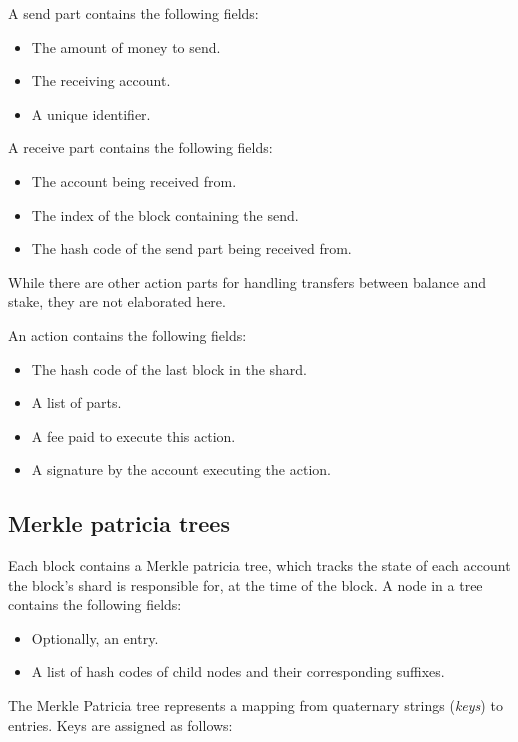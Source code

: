 \documentclass{article}
\begin{document}
A send part contains the following fields:

\begin{itemize}
  \item The amount of money to send.
  \item The receiving account.
  \item A unique identifier.
\end{itemize}

A receive part contains the following fields:

\begin{itemize}
  \item The account being received from.
  \item The index of the block containing the send.
  \item The hash code of the send part being received from.
\end{itemize}

While there are other action parts for handling transfers between balance and stake, they are not elaborated here.

An action contains the following fields:

\begin{itemize}
  \item The hash code of the last block in the shard.
  \item A list of parts.
  \item A fee paid to execute this action.
  \item A signature by the account executing the action.
\end{itemize}

\subsection{Merkle patricia trees}

Each block contains a Merkle patricia tree, which tracks the state of each
account the block's shard is responsible for, at the time of the block.
A node in a tree contains the following fields:

\begin{itemize}
  \item Optionally, an entry.
  \item A list of hash codes of child nodes and their corresponding suffixes.
\end{itemize}

The Merkle Patricia tree represents a mapping from quaternary strings
(\textit{keys}) to entries.  Keys are assigned as follows:
\end{document}
